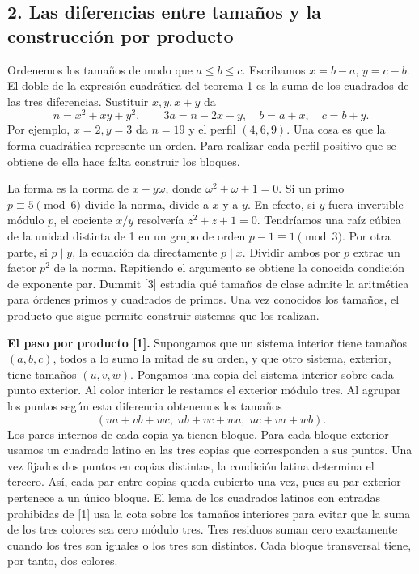 \documentclass[spanish,11pt,a4paper]{article}
\begin{document}
\subsection{2. Las diferencias entre tamaños y la construcción por producto}\label{las-diferencias-entre-tamauxf1os-y-la-construcciuxf3n-por-producto}

Ordenemos los tamaños de modo que \(a\le b\le c\). Escribamos \(x=b-a\), \(y=c-b\). El doble de la expresión cuadrática del teorema 1 es la suma de los cuadrados de las tres diferencias. Sustituir \(x,y,x+y\) da \[n=x^2+xy+y^2,\qquad 3a=n-2x-y,\quad b=a+x,\quad c=b+y.\] Por ejemplo, \(x=2,y=3\) da \(n=19\) y el perfil \((4,6,9)\). Una cosa es que la forma cuadrática represente un orden. Para realizar cada perfil positivo que se obtiene de ella hace falta construir los bloques.

La forma es la norma de \(x-y\omega\), donde \(\omega^2+\omega+1=0\). Si un primo \(p\equiv5\pmod6\) divide la norma, divide a \(x\) y a \(y\). En efecto, si \(y\) fuera invertible módulo \(p\), el cociente \(x/y\) resolvería \(z^2+z+1=0\). Tendríamos una raíz cúbica de la unidad distinta de 1 en un grupo de orden \(p-1\equiv1\pmod3\). Por otra parte, si \(p\mid y\), la ecuación da directamente \(p\mid x\). Dividir ambos por \(p\) extrae un factor \(p^2\) de la norma. Repitiendo el argumento se obtiene la conocida condición de exponente par. Dummit {[}3{]} estudia qué tamaños de clase admite la aritmética para órdenes primos y cuadrados de primos. Una vez conocidos los tamaños, el producto que sigue permite construir sistemas que los realizan.

\textbf{El paso por producto {[}1{]}.} Supongamos que un sistema interior tiene tamaños \((a,b,c)\), todos a lo sumo la mitad de su orden, y que otro sistema, exterior, tiene tamaños \((u,v,w)\). Pongamos una copia del sistema interior sobre cada punto exterior. Al color interior le restamos el exterior módulo tres. Al agrupar los puntos según esta diferencia obtenemos los tamaños \[(ua+vb+wc,\;ub+vc+wa,\;uc+va+wb).\] Los pares internos de cada copia ya tienen bloque. Para cada bloque exterior usamos un cuadrado latino en las tres copias que corresponden a sus puntos. Una vez fijados dos puntos en copias distintas, la condición latina determina el tercero. Así, cada par entre copias queda cubierto una vez, pues su par exterior pertenece a un único bloque. El lema de los cuadrados latinos con entradas prohibidas de {[}1{]} usa la cota sobre los tamaños interiores para evitar que la suma de los tres colores sea cero módulo tres. Tres residuos suman cero exactamente cuando los tres son iguales o los tres son distintos. Cada bloque transversal tiene, por tanto, dos colores.
\end{document}
